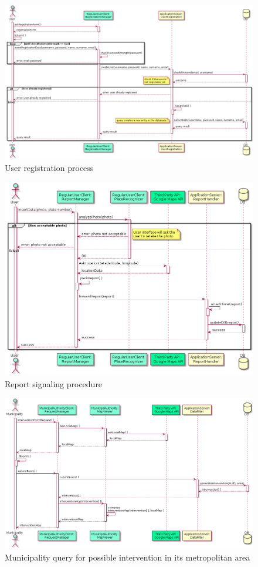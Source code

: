 \begin{figure}[H]
	\centering
	\includegraphics[width=\textwidth]{Images/seqDiag_userReg}
	\caption{User registration process}
\end{figure}
	\newpage

\begin{figure}[H]
	\centering
	\includegraphics[width=\textwidth]{Images/seqDiag_ReportSignal}
	\caption{Report signaling procedure}
\end{figure}
	\newpage	
	
\begin{figure}[H]
	\centering
	\includegraphics[width=\textwidth]{Images/seqDiag_Interventions}
	\caption{Municipality query for possible intervention in its metropolitan area}
\end{figure}
	\newpage

